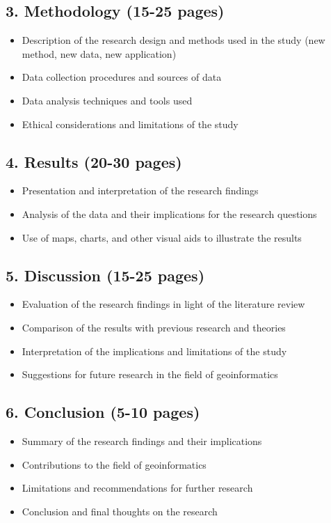 \subsection*{3. Methodology (15-25 pages)}
\begin{itemize}
\item Description of the research design and methods used in the study (new method, new data, new application)
\item Data collection procedures and sources of data
\item Data analysis techniques and tools used
\item Ethical considerations and limitations of the study
\end{itemize}

\subsection*{4. Results (20-30 pages)}
\begin{itemize}
\item Presentation and interpretation of the research findings
\item Analysis of the data and their implications for the research questions
\item Use of maps, charts, and other visual aids to illustrate the results
\end{itemize}

\subsection*{5. Discussion (15-25 pages)}
\begin{itemize}
\item Evaluation of the research findings in light of the literature review
\item Comparison of the results with previous research and theories
\item Interpretation of the implications and limitations of the study
\item Suggestions for future research in the field of geoinformatics
\end{itemize}

\subsection*{6. Conclusion (5-10 pages)}
\begin{itemize}
\item Summary of the research findings and their implications
\item Contributions to the field of geoinformatics
\item Limitations and recommendations for further research
\item Conclusion and final thoughts on the research
\end{itemize}

